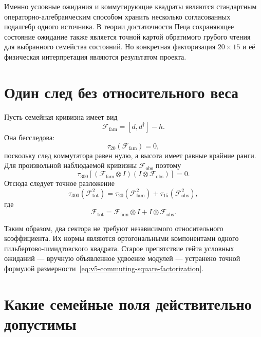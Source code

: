 Именно условные ожидания и коммутирующие квадраты являются стандартным
операторно-алгебраическим способом хранить несколько согласованных
подалгебр одного источника. В теории достаточности Пеца сохраняющее
состояние ожидание также является точной картой обратимого грубого чтения
для выбранного семейства состояний. Но конкретная факторизация
$20\times15$ и её физическая интерпретация являются результатом проекта.

\section{Один след без относительного веса}

Пусть семейная кривизна имеет вид
\begin{equation}
 \mathcal F_{\mathrm{fam}}=[d,d^\dagger]-h.
\end{equation}
Она бесследова:
\begin{equation}
 \tau_{20}(\mathcal F_{\mathrm{fam}})=0,
\end{equation}
поскольку след коммутатора равен нулю, а высота имеет равные крайние ранги.
Для произвольной наблюдаемой кривизны $\mathcal F_{\mathrm{obs}}$ поэтому
\begin{equation}
 \tau_{300}\!\left[
 (\mathcal F_{\mathrm{fam}}\otimes I)
 (I\otimes\mathcal F_{\mathrm{obs}})
 \right]=0.
\end{equation}
Отсюда следует точное разложение
\begin{equation}
 \boxed{
 \tau_{300}(\mathcal F_{\mathrm{tot}}^2)
 =\tau_{20}(\mathcal F_{\mathrm{fam}}^2)
 +\tau_{15}(\mathcal F_{\mathrm{obs}}^2),
 }
 \label{eq:v5-one-trace-pythagoras}
\end{equation}
где
\begin{equation}
 \mathcal F_{\mathrm{tot}}
 =\mathcal F_{\mathrm{fam}}\otimes I
 +I\otimes\mathcal F_{\mathrm{obs}}.
\end{equation}

Таким образом, два сектора не требуют независимого относительного
коэффициента. Их нормы являются ортогональными компонентами одного
гильбертово-шмидтовского квадрата. Старое препятствие гейта условных
ожиданий --- вручную объявленное удвоение модулей --- устранено точной
формулой размерности~\eqref{eq:v5-commuting-square-factorization}.

\section{Какие семейные поля действительно допустимы}

